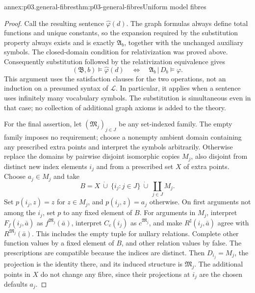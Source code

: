 \begin{annexitem}{annex:p03.general-fibres}{thm:p03-general-fibres}{Uniform model fibres}
\begin{proof}
Call the resulting sentence \(\widehat\varphi(d)\). The graph formulas
always define total functions and unique constants, so the expansion
required by the substitution property always exists and is exactly
\(\mathfrak A_b\), together with the unchanged auxiliary symbols.
The closed-domain condition for relativization was proved above.
Consequently substitution followed by the relativization equivalence
gives
\[
 (\mathfrak B,b)\models\widehat\varphi(d)
 \quad\Longleftrightarrow\quad
 \mathfrak A_b\,|\,D_b\models\varphi.
\]
This argument uses the satisfaction clauses for the two operations,
not an induction on a presumed syntax of \(\mathscr L\). In particular,
it applies when a sentence uses infinitely many vocabulary symbols.
The substitution is simultaneous even in that case; no collection of
additional graph axioms is added to the theory.

For the final assertion, let \((\mathfrak M_j)_{j\in J}\) be
any set-indexed family. The empty family imposes no requirement;
choose a nonempty ambient domain containing any prescribed extra
points and interpret the symbols arbitrarily. Otherwise replace
the domains by pairwise disjoint isomorphic copies \(M_j\),
also disjoint from distinct new index elements \(i_j\) and from
a prescribed set \(X\) of extra points. Choose \(a_j\in M_j\)
and take
\[
 B=X\ \mathbin{\dot\cup}\ \{i_j:j\in J\}
       \ \mathbin{\dot\cup}\ \coprod_{j\in J}M_j.
\]
Set \(p(i_j,z)=z\) for \(z\in M_j\), and
\(p(i_j,z)=a_j\) otherwise. On first arguments not among the
\(i_j\), set \(p\) to any fixed element of \(B\).
For arguments in \(M_j\), interpret \(F_f(i_j,\bar a)\)
as \(f^{\mathfrak M_j}(\bar a)\), interpret \(C_c(i_j)\)
as \(c^{\mathfrak M_j}\), and make
\(R^\sharp(i_j,\bar a)\) agree with
\(R^{\mathfrak M_j}(\bar a)\). This includes the empty tuple
for nullary relations. Complete other function values by a fixed
element of \(B\), and other relation values by false.
The prescriptions are compatible because the indices are distinct.
Then \(D_{i_j}=M_j\), the projection is the identity there,
and its induced structure is \(\mathfrak M_j\). The additional
points in \(X\) do not change any fibre, since their projections
at \(i_j\) are the chosen defaults \(a_j\).
\end{proof}
\end{annexitem}

